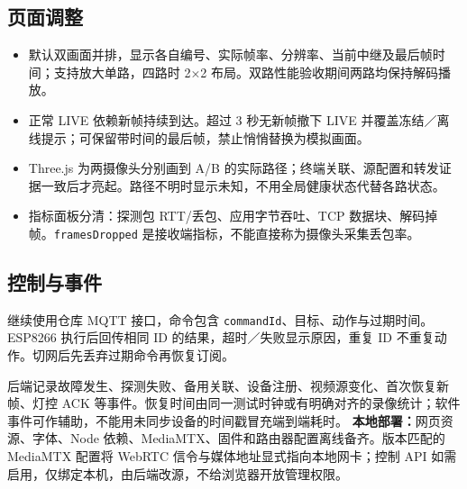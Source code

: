 \documentclass[UTF8,a4paper,11pt,fontset=windows]{ctexart}
\newcommand{\code}[1]{{\small\nolinkurl{#1}}}
\begin{document}
\subsection*{页面调整}
\begin{itemize}
\item 默认双画面并排，显示各自编号、实际帧率、分辨率、当前中继及最后帧时间；支持放大单路，四路时 2×2 布局。双路性能验收期间两路均保持解码播放。
\item 正常 LIVE 依赖新帧持续到达。超过 3 秒无新帧撤下 LIVE 并覆盖冻结／离线提示；可保留带时间的最后帧，禁止悄悄替换为模拟画面。
\item Three.js 为两摄像头分别画到 A/B 的实际路径；终端关联、源配置和转发证据一致后才亮起。路径不明时显示未知，不用全局健康状态代替各路状态。
\item 指标面板分清：探测包 RTT/丢包、应用字节吞吐、TCP 数据块、解码掉帧。\code{framesDropped} 是接收端指标，不能直接称为摄像头采集丢包率。
\end{itemize}
\subsection*{控制与事件}
继续使用仓库 MQTT 接口，命令包含 \code{commandId}、目标、动作与过期时间。ESP8266 执行后回传相同 ID 的结果，超时／失败显示原因，重复 ID 不重复动作。切网后先丢弃过期命令再恢复订阅。

后端记录故障发生、探测失败、备用关联、设备注册、视频源变化、首次恢复新帧、灯控 ACK 等事件。恢复时间由同一测试时钟或有明确对齐的录像统计；软件事件可作辅助，不能用未同步设备的时间戳冒充端到端耗时。
\textbf{本地部署：}网页资源、字体、Node 依赖、MediaMTX、固件和路由器配置离线备齐。版本匹配的 MediaMTX 配置将 WebRTC 信令与媒体地址显式指向本地网卡；控制 API 如需启用，仅绑定本机，由后端改源，不给浏览器开放管理权限。
\end{document}
